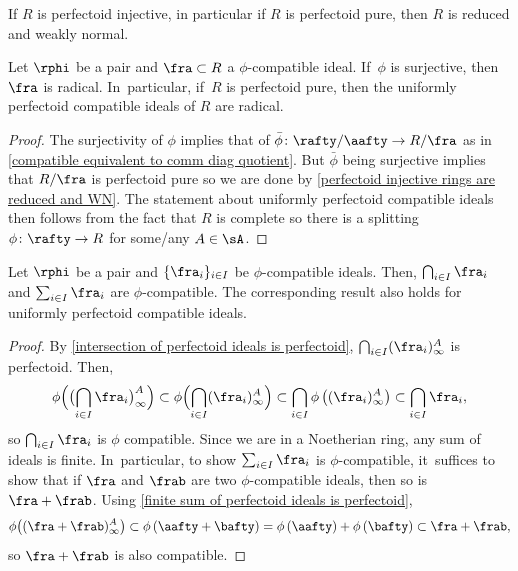 \begin{proposition}\label{perfectoid injective rings are reduced and WN}
If $R$ is perfectoid injective, in particular if $R$ is perfectoid pure, then $R$ is reduced and weakly normal.
\end{proposition}

\begin{corollary}\label{compatible ideals are radical}
Let $\rphi$ be a pair and $\fra\subset R$ a $\phi$-compatible ideal. If~$\phi$ is surjective, then $\fra$ is radical. In~particular, if~$R$ is perfectoid pure, then the uniformly perfectoid compatible ideals of $R$ are radical.
\end{corollary}

\begin{proof}
The surjectivity of $\phi$ implies that of $\bar{\phi}\colon \rafty/\aafty\to R/\fra$ as in \autoref{compatible equivalent to comm diag quotient}.
But $\bar{\phi}$ being surjective implies that $R/\fra$ is perfectoid pure so we are done by \autoref{perfectoid injective rings are reduced and WN}. The statement about uniformly perfectoid compatible ideals then follows from the fact that $R$ is complete so there is a splitting $\phi\colon \rafty \to R$ for some/any $A\in \sA$.
\end{proof}

\begin{proposition}\label{lemma compatible ideals closed under sums intersection}
Let $\rphi$ be a pair and $\{\fra_i\}_{i\in I}$ be $\phi$-compatible ideals. Then, $\bigcap_{i\in I} \fra_i$ and $\sum_{i\in I} \fra_i$ are $\phi$-compatible. The corresponding result also holds for uniformly perfectoid compatible ideals.
\end{proposition}

\begin{proof}
By \autoref{intersection of perfectoid ideals is perfectoid}, $\bigcap_{i\in I} (\fra_i)^A_\infty$ is perfectoid.
Then,\vspace*{-3pt}
\[\phi\Bigl(\bigl(\bigcap_{i\in I} \fra_i\bigr)^A_\infty\Bigr)\subset \phi \Bigl(\bigcap_{i\in I} (\fra_i)^A_\infty \Bigr)\subset \bigcap_{i\in I} \phi\left((\fra_i)^A_\infty\right)\subset \bigcap_{i\in I} \fra_i,
\]
so $\bigcap_{i\in I} \fra_i$ is $\phi$ compatible. Since we are in a Noetherian ring, any sum of ideals is finite. In~particular, to show $\sum_{i\in I} \fra_i$ is $\phi$-compatible, it~suffices to show that if $\fra$ and $\frab$ are two $\phi$-compatible ideals, then so is $\fra+\frab$.
Using \autoref{finite sum of perfectoid ideals is perfectoid},\vspace*{-3pt}
\[\phi \bigl((\fra+ \frab)^A_\infty \bigr)\subset\phi\left(\aafty+ \bafty\right) = \phi\left(\aafty\right)+\phi\left(\bafty\right)\subset \fra + \frab,
\]
so $\fra+\frab$ is also compatible.
\end{proof}

